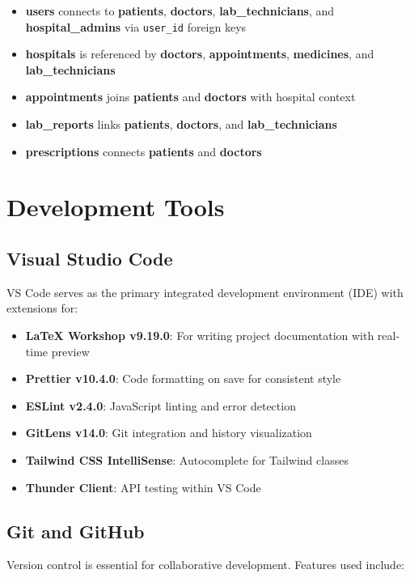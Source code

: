 \begin{itemize}
    \item \textbf{users} connects to \textbf{patients}, \textbf{doctors}, \textbf{lab\_technicians}, and \textbf{hospital\_admins} via \texttt{user\_id} foreign keys
    \item \textbf{hospitals} is referenced by \textbf{doctors}, \textbf{appointments}, \textbf{medicines}, and \textbf{lab\_technicians}
    \item \textbf{appointments} joins \textbf{patients} and \textbf{doctors} with hospital context
    \item \textbf{lab\_reports} links \textbf{patients}, \textbf{doctors}, and \textbf{lab\_technicians}
    \item \textbf{prescriptions} connects \textbf{patients} and \textbf{doctors}
\end{itemize}

\section{Development Tools}

\subsection{Visual Studio Code}
VS Code serves as the primary integrated development environment (IDE) with extensions for:

\begin{itemize}
    \item \textbf{LaTeX Workshop v9.19.0}: For writing project documentation with real-time preview
    \item \textbf{Prettier v10.4.0}: Code formatting on save for consistent style
    \item \textbf{ESLint v2.4.0}: JavaScript linting and error detection
    \item \textbf{GitLens v14.0}: Git integration and history visualization
    \item \textbf{Tailwind CSS IntelliSense}: Autocomplete for Tailwind classes
    \item \textbf{Thunder Client}: API testing within VS Code
\end{itemize}

\subsection{Git and GitHub}
Version control is essential for collaborative development. Features used include:

